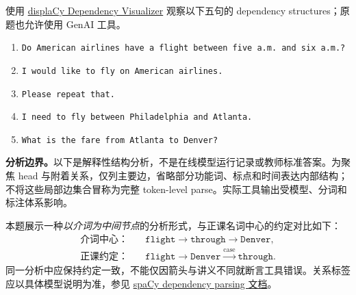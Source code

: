 使用 \href{https://demos.explosion.ai/displacy}{displaCy Dependency Visualizer} 观察以下五句的 dependency structures；原题也允许使用 GenAI 工具。
\begin{enumerate}[label=\alph*)]
  \item \texttt{Do American airlines have a flight between five a.m. and six a.m.?}
  \item \texttt{I would like to fly on American airlines.}
  \item \texttt{Please repeat that.}
  \item \texttt{I need to fly between Philadelphia and Atlanta.}
  \item \texttt{What is the fare from Atlanta to Denver?}
\end{enumerate}

\begin{checkedsolution}
\textbf{分析边界。}以下是解释性结构分析，不是在线模型运行记录或教师标准答案。为聚焦 head 与附着关系，仅列主要边，省略部分功能词、标点和时间表达内部结构；不将这些局部边集合冒称为完整 token-level parse。实际工具输出受模型、分词和标注体系影响。

本题展示一种\emph{以介词为中间节点}的分析形式，与正课名词中心的约定对比如下：
\[
\begin{aligned}
\text{介词中心：}\quad&\texttt{flight}\rightarrow\texttt{through}\rightarrow\texttt{Denver},\\
\text{正课约定：}\quad&\texttt{flight}\rightarrow\texttt{Denver}\xrightarrow{\mathrm{case}}\texttt{through}.
\end{aligned}
\]
同一分析中应保持约定一致，不能仅因箭头与讲义不同就断言工具错误。关系标签应以具体模型说明为准，参见 \href{https://spacy.io/usage/linguistic-features\#dependency-parse}{spaCy dependency parsing 文档}。


\end{checkedsolution}
